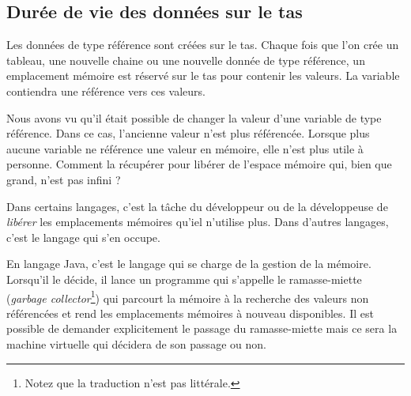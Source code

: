 \subsection{Durée de vie des données sur le tas}

Les données de type référence sont créées sur le tas. Chaque fois que l'on crée
un tableau, une nouvelle chaine ou une nouvelle donnée de type référence, un
emplacement mémoire est réservé sur le tas pour contenir les valeurs. La
variable contiendra une référence vers ces valeurs. 

Nous avons vu qu'il était possible de changer la valeur d'une variable de type
référence. Dans ce cas, l'ancienne valeur n'est plus référencée. Lorsque plus
aucune variable ne référence une valeur en mémoire, elle n'est plus utile
à personne. Comment la récupérer pour libérer de l'espace mémoire qui, bien que
grand, n'est pas infini ?

Dans certains langages, c'est la tâche du développeur ou de la développeuse de
\textit{libérer} les emplacements mémoires qu'iel n'utilise plus. Dans d'autres
langages, c'est le langage qui s'en occupe. 

En langage Java, c'est le langage qui se charge de la gestion de la mémoire.
Lorsqu'il le décide, il lance un programme qui s'appelle le ramasse-miette
(\textit{garbage collector}\footnote{Notez que la traduction n'est pas
littérale.}) qui parcourt la mémoire à la recherche des valeurs non référencées
et rend les emplacements mémoires à nouveau disponibles. Il est possible de
demander explicitement le passage du ramasse-miette mais ce sera la machine
virtuelle qui décidera de son passage ou non. 




